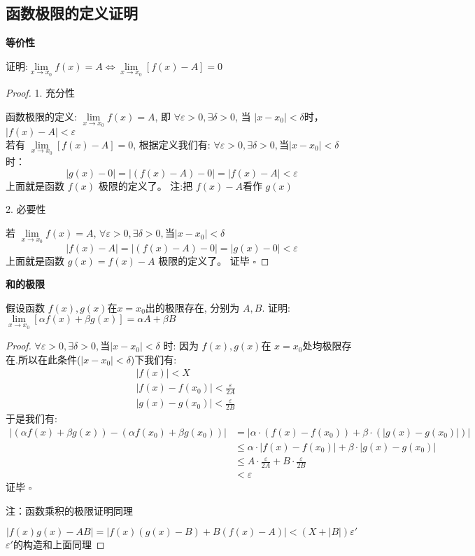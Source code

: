 \subsection{函数极限的定义证明}
\newcommand{\Lim}[1]{\lim\limits_{x\to x_0}{#1}}


\noindent\textbf{等价性}

    证明:$\Lim{f(x)} = A \Leftrightarrow  \Lim{\left[f(x)-A\right]} = 0$

\begin{proof}

\textsf{1. 充分性}\par 
函数极限的定义: $\Lim{f(x)} = A$, 即 $\forall \varepsilon >0, \exists \delta>0$, 
当 $|x-x_0|<\delta$时， $|f(x)-A|<\varepsilon$\\
\bigskip
若有 $\Lim{[f(x)-A]} = 0$, 根据定义我们有:
$\forall \varepsilon>0, \exists \delta>0, \mbox{当}|x-x_0|<\delta$ 时：
\[
    |g(x) -0|= |(f(x)-A)-0|=|f(x)-A|<\varepsilon
\]
上面就是函数 $f(x)$ 极限的定义了。 注:把 $f(x)-A$看作 $g(x)$

\textsf{2. 必要性}\par 
若 $\Lim{f(x)} = A$, $\forall \varepsilon>0, \exists \delta>0, \mbox{当}|x-x_0|<\delta$
\[
    |f(x)-A| = |(f(x)-A) -0| = |g(x) -0|< \varepsilon
\] 
上面就是函数 $g(x) = f(x)-A$ 极限的定义了。
\textsf{证毕}
$\square$
\end{proof}

\noindent\textbf{和的极限}

\noindent 假设函数 $f(x), g(x) \mbox{在} x=x_0 $出的极限存在, 分别为 $A, B$.
证明: $\Lim{[\alpha f(x)+\beta g(x)]} = \alpha A + \beta B$

\begin{proof}

    $\forall \varepsilon>0, \exists \delta>0, \mbox{当}|x-x_0|<\delta$ 时:
    因为 $f(x), g(x)$在 $x=x_0$处均极限存在.所以在此条件($|x-x_0|<\delta$)下我们有:
\begin{align*}
    & | f(x) |< X\\
    & |f(x)-f(x_0)| <\frac{\varepsilon}{2A} \\
    & |g(x)-g(x_0)| <\frac{\varepsilon}{2B}
\end{align*}
于是我们有:
\begin{align*}
    |(\alpha f(x)+\beta g(x)) - (\alpha f(x_0)+\beta g(x_0))| 
    &= |\alpha\cdot(f(x)-f(x_0)) + \beta\cdot(|g(x)-g(x_0)|)| \\
    & \le \alpha\cdot|f(x)-f(x_0)| + \beta\cdot|g(x)-g(x_0)|\\
    & \le A\cdot\frac{\varepsilon}{2A} + B\cdot\frac{\varepsilon}{2B}\\
    & < \varepsilon  
\end{align*}
\textsf{证毕}
$\square$

\textsf{注：函数乘积的极限证明同理}\par 
\[
    | f(x)g(x)-AB|=| f(x)(g(x)-B)+B(f(x)-A)|<(X+ |B|)\varepsilon'  
\]
$\varepsilon'$的构造和上面同理

\end{proof}